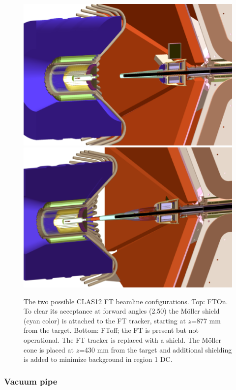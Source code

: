\begin{figure}
	\centering
	\includegraphics[width=0.99\columnwidth,keepaspectratio]{img/ftOnGeometry.png}
	\includegraphics[width=0.99\columnwidth,keepaspectratio]{img/ftOffGeometry.png}
	\caption{The two possible CLAS12 FT beamline configurations. Top: FTOn. To clear its acceptance at forward angles (2.50\mdeg)
             the M\"oller shield (cyan color) is attached to the FT tracker, starting at $z$=877 mm from the target.
             Bottom: FToff; the FT is present but not operational. The FT tracker is replaced with a shield.
             The M\"oller cone is placed at $z$=430 mm from the target and additional shielding
             is added to minimize background in region 1 DC.}
	\label{fig:beamlineGeometry}
\end{figure}

\subsubsection{Vacuum pipe}

